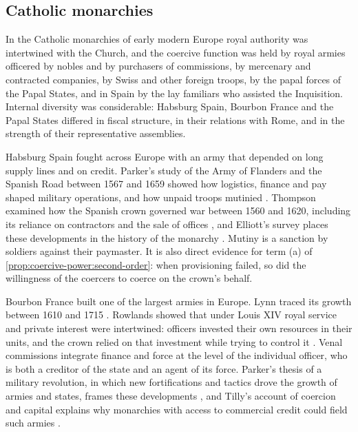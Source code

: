 \documentclass[11pt,letterpaper]{article}
\theoremstyle{definition}
\theoremstyle{remark}
\begin{document}
\subsection{Catholic monarchies}
\label{sec:catholic}

In the Catholic monarchies of early modern Europe royal authority was intertwined with the Church, and the coercive function was held by royal armies officered by nobles and by purchasers of commissions, by mercenary and contracted companies, by Swiss and other foreign troops, by the papal forces of the Papal States, and in Spain by the lay familiars who assisted the Inquisition. Internal diversity was considerable: Habsburg Spain, Bourbon France and the Papal States differed in fiscal structure, in their relations with Rome, and in the strength of their representative assemblies.

Habsburg Spain fought across Europe with an army that depended on long supply lines and on credit. Parker's study of the Army of Flanders and the Spanish Road between 1567 and 1659 showed how logistics, finance and pay shaped military operations, and how unpaid troops mutinied \citep{parker1972}. Thompson examined how the Spanish crown governed war between 1560 and 1620, including its reliance on contractors and the sale of offices \citep{thompson1976}, and Elliott's survey places these developments in the history of the monarchy \citep{elliott1963}. Mutiny is a sanction by soldiers against their paymaster. It is also direct evidence for term (a) of \cref{prop:coercive-power:second-order}: when provisioning failed, so did the willingness of the coercers to coerce on the crown's behalf.

Bourbon France built one of the largest armies in Europe. Lynn traced its growth between 1610 and 1715 \citep{lynn1997}. Rowlands showed that under Louis XIV royal service and private interest were intertwined: officers invested their own resources in their units, and the crown relied on that investment while trying to control it \citep{rowlands2002}. Venal commissions integrate finance and force at the level of the individual officer, who is both a creditor of the state and an agent of its force. Parker's thesis of a military revolution, in which new fortifications and tactics drove the growth of armies and states, frames these developments \citep{parker1988}, and Tilly's account of coercion and capital explains why monarchies with access to commercial credit could field such armies \citep{tilly1990}.
\end{document}
